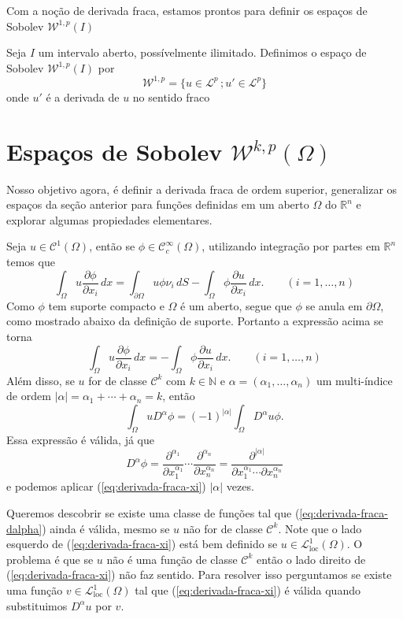 \documentclass[a4paper, 11pt]{book}
\theoremstyle{definition}
\newcommand{\bN}{\mathbb{N}}
\newcommand{\bR}{\mathbb{R}}
\newcommand{\cC}{\mathcal{C}}
\newcommand{\cL}{\mathcal{L}}
\newcommand{\cW}{\mathcal{W}}
\begin{document}
Com a noção de derivada fraca, estamos prontos para definir os espaços de Sobolev $\cW^{1,p}(I)$

\begin{dbox}
    Seja $I$ um intervalo aberto, possívelmente ilimitado.
    Definimos o espaço de Sobolev $\cW^{1,p}(I)$ por
    \[
        \cW^{1,p} = \{u \in \cL^p \,; u' \in \cL^p\}
    \]
    onde $u'$ é a derivada de $u$ no sentido fraco
\end{dbox}

\section{Espaços de Sobolev $\cW^{k,p}(\Omega)$}

Nosso objetivo agora, é definir a derivada fraca de ordem superior, generalizar os espaços da seção anterior para funções definidas em um aberto $\Omega$ do $\bR^n$ e explorar algumas propiedades elementares.

Seja $u \in \cC^1(\Omega)$, então se $\phi \in \cC^\infty_c(\Omega)$, utilizando integração por partes em $\bR^n$ temos que
\[
    \int_\Omega u \dfrac{\partial \phi}{\partial x_i} \,dx = \int_{\partial\Omega} u\phi \nu_i \, dS- \int_\Omega \phi \dfrac{\partial u}{\partial x_i} \,dx. \qquad (i = 1,\dots,n)
\]
Como $\phi$ tem suporte compacto e $\Omega$ é um aberto, segue que $\phi$ se anula em $\partial\Omega$, como mostrado abaixo da definição de suporte. Portanto a expressão acima se torna
\begin{equation} \label{eq:derivada-fraca-xi}
    \int_\Omega u \dfrac{\partial \phi}{\partial x_i} \,dx = - \int_\Omega \phi \dfrac{\partial u}{\partial x_i} \,dx. \qquad (i = 1,\dots,n)
\end{equation}
Além disso, se $u$ for de classe $\cC^k$ com $k \in \bN$ e $\alpha = (\alpha_1,\dots,\alpha_n)$ um multi-índice de ordem $|\alpha| = \alpha_1 + \cdots + \alpha_n = k$, então
\begin{equation} \label{eq:derivada-fraca-dalpha}
    \int_\Omega u D^\alpha \phi = (-1)^{|\alpha|} \int_\Omega D^\alpha u \phi.
\end{equation}
Essa expressão é válida, já que
\[
    D^\alpha \phi = \dfrac{\partial^{\alpha_1} }{\partial x_1^{\alpha_1}} \cdots \dfrac{\partial^{\alpha_n} }{\partial x_n^{\alpha_n}} = \dfrac{\partial^{|\alpha|} }{\partial x_1^{\alpha_1} \cdots \partial x_n^{\alpha_n}}
\]
e podemos aplicar (\ref{eq:derivada-fraca-xi}) $|\alpha|$ vezes.

Queremos descobrir se existe uma classe de funções tal que (\ref{eq:derivada-fraca-dalpha}) ainda é válida, mesmo se $u$ não for de classe $\cC ^k$. Note que o lado esquerdo de (\ref{eq:derivada-fraca-xi}) está bem definido se $u \in \cL^1_{\mathrm{loc}}(\Omega)$.
O problema é que se $u$ não é uma função de classe $\cC^k$ então o lado direito de (\ref{eq:derivada-fraca-xi}) não faz sentido. Para resolver isso perguntamos se existe uma função $v \in \cL^1_{\mathrm{loc}}(\Omega)$ tal que (\ref{eq:derivada-fraca-xi}) é válida quando substituimos $D^\alpha u$ por $v$.
\end{document}
